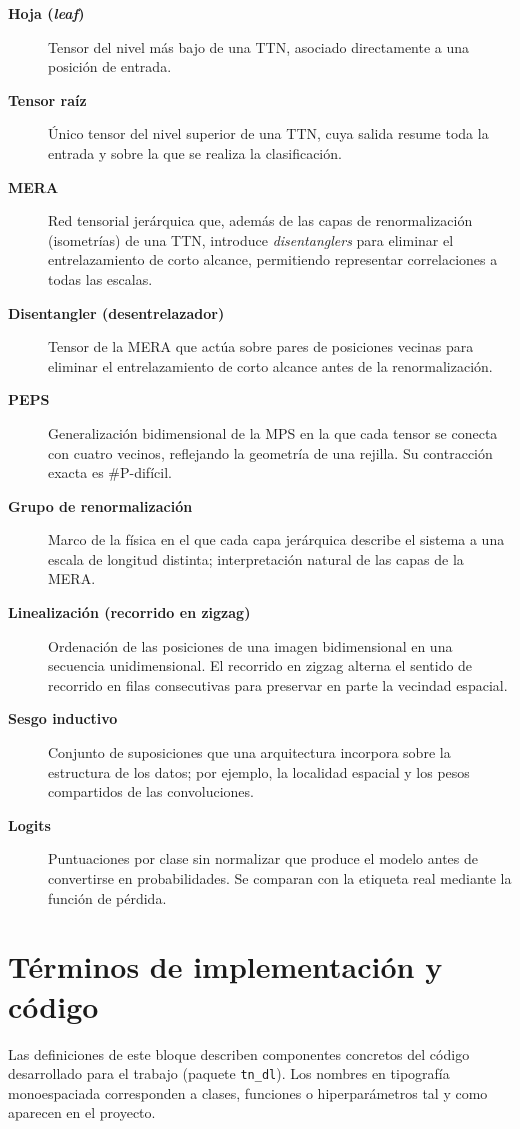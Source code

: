 \begin{description}
  \item[\textbf{Hoja (\textit{leaf})}] Tensor del nivel más bajo de una TTN, asociado directamente a una posición de entrada.
  \item[\textbf{Tensor raíz}] Único tensor del nivel superior de una TTN, cuya salida resume toda la entrada y sobre la que se realiza la clasificación.
  \item[\textbf{MERA}] Red tensorial jerárquica que, además de las capas de renormalización (isometrías) de una TTN, introduce \textit{disentanglers} para eliminar el entrelazamiento de corto alcance, permitiendo representar correlaciones a todas las escalas.
  \item[\textbf{Disentangler (desentrelazador)}] Tensor de la MERA que actúa sobre pares de posiciones vecinas para eliminar el entrelazamiento de corto alcance antes de la renormalización.
  \item[\textbf{PEPS}] Generalización bidimensional de la MPS en la que cada tensor se conecta con cuatro vecinos, reflejando la geometría de una rejilla. Su contracción exacta es \#P-difícil.
  \item[\textbf{Grupo de renormalización}] Marco de la física en el que cada capa jerárquica describe el sistema a una escala de longitud distinta; interpretación natural de las capas de la MERA.
  \item[\textbf{Linealización (recorrido en zigzag)}] Ordenación de las posiciones de una imagen bidimensional en una secuencia unidimensional. El recorrido en zigzag alterna el sentido de recorrido en filas consecutivas para preservar en parte la vecindad espacial.
  \item[\textbf{Sesgo inductivo}] Conjunto de suposiciones que una arquitectura incorpora sobre la estructura de los datos; por ejemplo, la localidad espacial y los pesos compartidos de las convoluciones.
  \item[\textbf{Logits}] Puntuaciones por clase sin normalizar que produce el modelo antes de convertirse en probabilidades. Se comparan con la etiqueta real mediante la función de pérdida.
\end{description}

\section*{Términos de implementación y código}

Las definiciones de este bloque describen componentes concretos del código desarrollado para el trabajo (paquete \texttt{tn\_dl}). Los nombres en tipografía monoespaciada corresponden a clases, funciones o hiperparámetros tal y como aparecen en el proyecto.

